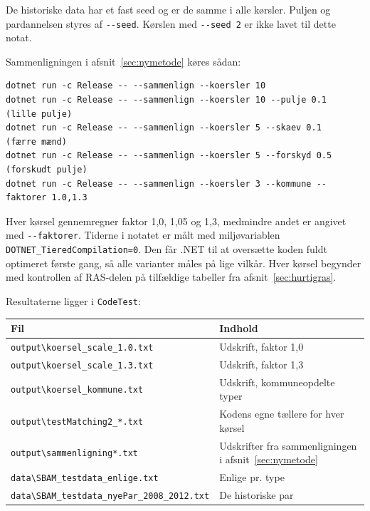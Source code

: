 \documentclass[11pt,a4paper]{article}
\newcommand{\kode}[1]{\texttt{#1}}
\begin{document}
De historiske data har et fast seed og er de samme i alle kørsler. Puljen og pardannelsen styres af
\kode{-{}-seed}. Kørslen med \kode{-{}-seed 2} er ikke lavet til dette notat.

Sammenligningen i afsnit~\ref{sec:nymetode} køres sådan:

{\small
\begin{verbatim}
dotnet run -c Release -- --sammenlign --koersler 10
dotnet run -c Release -- --sammenlign --koersler 10 --pulje 0.1    (lille pulje)
dotnet run -c Release -- --sammenlign --koersler 5 --skaev 0.1     (færre mænd)
dotnet run -c Release -- --sammenlign --koersler 5 --forskyd 0.5   (forskudt pulje)
dotnet run -c Release -- --sammenlign --koersler 3 --kommune --faktorer 1.0,1.3
\end{verbatim}
}

Hver kørsel gennemregner faktor 1,0, 1,05 og 1,3, medmindre andet er angivet med
\kode{-{}-faktorer}. Tiderne i notatet er målt med miljøvariablen
\kode{DOTNET\_TieredCompilation=0}. Den får .NET til at oversætte koden fuldt optimeret første gang,
så alle varianter måles på lige vilkår. Hver kørsel begynder med kontrollen af RAS-delen på
tilfældige tabeller fra afsnit~\ref{sec:hurtigras}.

Resultaterne ligger i \kode{CodeTest}:

\begin{center}
\begin{tabular}{@{}ll@{}}
\toprule
Fil & Indhold \\
\midrule
\kode{output\textbackslash koersel\_scale\_1.0.txt} & Udskrift, faktor 1,0 \\
\kode{output\textbackslash koersel\_scale\_1.3.txt} & Udskrift, faktor 1,3 \\
\kode{output\textbackslash koersel\_kommune.txt} & Udskrift, kommuneopdelte typer \\
\kode{output\textbackslash testMatching2\_*.txt} & Kodens egne tællere for hver kørsel \\
\kode{output\textbackslash sammenligning*.txt} & Udskrifter fra sammenligningen i afsnit~\ref{sec:nymetode} \\
\kode{data\textbackslash SBAM\_testdata\_enlige.txt} & Enlige pr. type \\
\kode{data\textbackslash SBAM\_testdata\_nyePar\_2008\_2012.txt} & De historiske par \\
\bottomrule
\end{tabular}
\end{center}
\end{document}
